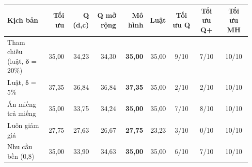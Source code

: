 \begin{tabular}{lrrrrrccc}
\toprule
Kịch bản & Tối ưu & Q (d,c) & Q mở rộng & Mô hình & Luật & Tối ưu Q & Tối ưu Q+ & Tối ưu MH \\
\midrule
Tham chiếu (luật, δ = 20\%) & 35{,}00 & 34{,}23 & 34{,}30 & \textbf{35{,}00} & 35{,}00 & 9/10 & 7/10 & 10/10 \\
Luật, δ = 5\% & 37{,}35 & 36{,}84 & 36{,}84 & \textbf{37{,}35} & 35{,}00 & 2/10 & 2/10 & 10/10 \\
Ăn miếng trả miếng & 35{,}00 & 33{,}75 & 34{,}24 & \textbf{35{,}00} & 35{,}00 & 7/10 & 8/10 & 10/10 \\
Luôn giảm giá & 27{,}75 & 27{,}63 & 26{,}67 & \textbf{27{,}75} & 23{,}23 & 3/10 & 0/10 & 10/10 \\
Nhu cầu bền (0,8) & 35{,}00 & 33{,}90 & 34{,}63 & \textbf{35{,}00} & 35{,}00 & 6/10 & 7/10 & 10/10 \\
\bottomrule
\end{tabular}
